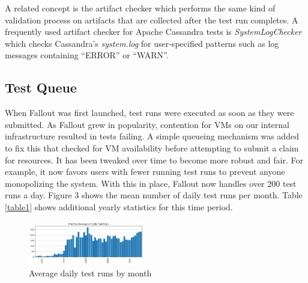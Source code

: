 \documentclass[a4paper,fleqn]{cas-dc}
\begin{document}
A related concept is the artifact checker which performs the same kind of validation process on
artifacts that are collected after the test run completes. A frequently used artifact checker for
Apache Cassandra tests is \emph{SystemLogChecker} which checks Cassandra’s \emph{system.log} for user-specified
patterns such as log messages containing “ERROR” or “WARN”.

\subsection{Test Queue}

When Fallout was first launched, test runs were executed as soon as they were submitted. As Fallout
grew in popularity, contention for VMs on our internal infrastructure resulted in tests failing. A
simple queueing mechanism was added to fix this that checked for VM availability before attempting
to submit a claim for resources. It has been tweaked over time to become more robust and fair.
For example, it now favors users with fewer running test runs to prevent anyone monopolizing the
system. With this in place, Fallout now handles over 200 test runs a day. Figure 3 shows the mean
number of daily test runs per month. Table \ref{table1} shows additional yearly statistics for this time
period.

\begin{figure}
	\includegraphics[width=0.45\textwidth]{average-daily-testruns-by-month.png}
	\caption{Average daily test runs by month}\label{Figure 3}
\end{figure}


\end{document}
